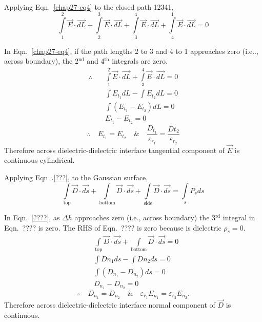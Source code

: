 Applying Eqn.~\eqref{chap27-eq4} to the closed path 12341,
\begin{equation*}
\textstyle\int\limits_{1}^{2} \vec{E} \cdot \vec{dL} + \int\limits_{2}^{3} \vec{E} \cdot \vec{dL} + \int\limits_{3}^{4} \vec{E} \cdot \vec{dL} + \int\limits_{4}^{1} \vec{E} \cdot \vec{dL} = 0\label{chap27-eq4}
\end{equation*}

In Eqn.~\eqref{chap27-eq4}, if the path lengths 2 to 3 and 4 to 1 approaches zero (i.e.., across boundary), the 2$^{\text{nd}}$ and 4$^{\text{th}}$ integrals are zero. 
\begin{align*}
\therefore\quad  &\textstyle\int\limits_{1}^{2} \vec{E} \cdot \vec{dL} + \int\limits_{3}^{4} \vec{E} \cdot \vec{dL} = 0\\
 & \textstyle\int E_{t_{1}}dL - \int E_{t_{2}}dL  = 0\\
 & \textstyle\int \left(E_{t_{1}} - E_{t_{2}}\right)dL  = 0\\
 & E_{t_{1}} - E_{t_{2}} = 0
\end{align*} 
$$
\therefore\quad E_{t_{1}} = E_{t_{2}} \quad\text{\&}\quad \dfrac{D_{t_{1}}}{\varepsilon_{r_{1}}} = \dfrac{Dt_{2}}{\varepsilon_{r_{2}}}
$$
Therefore across dielectric-dielectric interface 
tangential component of $\vec{E}$ is continuous cylindrical. 

Applying Eqn~.\eqref{???}, to the Gaussian surface, 
\begin{equation*}
\textstyle\int\limits_{\text{top}} \vec{D} \cdot \vec{ds} + \int\limits_{\text{bottom}} \vec{D} \cdot \vec{ds} + \int\limits_{\text{side}} \vec{D} \cdot \vec{ds} = \int\limits_{s} P_{s}ds\label{chap27-eq27.5}
\end{equation*}

\newpage

In Eqn.~\eqref{????}, as $\Delta h$ approaches zero (i.e., across boundary) the 3$^{\text{rd}}$ integral in Eqn.~???? is zero. The RHS of Eqn.~???? is zero because is dielectric $\rho_{s} = 0$.
\begin{align*}
& \textstyle\int\limits_{\text{top}} \vec{D} \cdot \vec{ds} + \int\limits_{\text{bottom}} \vec{D} \cdot \vec{ds} = 0\\
& \textstyle\int Dn_{1}ds - \int Dn_{2}ds  = 0\\
& \textstyle\int (D_{n_{1}} - D_{n_{2}})ds = 0\\
& D_{n_{1}} - D_{n_{2}}  = 0
\end{align*}
$$
\textstyle\therefore\quad  D_{n_{1}} = D_{n_{2}}  \quad\text{\&}\quad \varepsilon_{r_{1}}E_{n_{1}} = \varepsilon_{r_{2}}E_{n_{2}}. 
$$
Therefore across dielectric-dielectric interface normal component of $\vec{D}$ is continuous. 

